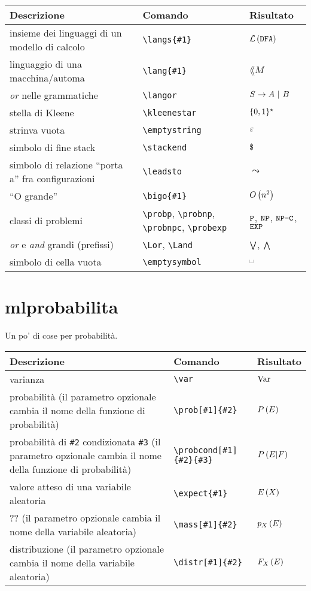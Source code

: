 \documentclass[draft]{article}
\begin{document}
\begin{center}
\begin{tabular}{ | p{7cm} | p{4cm} | p{4cm} | }
	\hline
	Descrizione & Comando & Risultato \\
	\hline
	insieme dei linguaggi di un modello di calcolo & \verb|\langs{#1}| & $\mathcal{L}\left( {\texttt{DFA}} \right)$ \\ \hline
	linguaggio di una macchina/automa & \verb|\lang{#1}| & $\lang{M}$ \\ \hline
	\emph{or} nelle grammatiche & \verb|\langor| & $S \to A \ | \  B$ \\ \hline
	stella di Kleene & \verb|\kleenestar| & $\{0,1\}^{\star}$ \\ \hline
	strinva vuota & \verb|\emptystring| & $\varepsilon$ \\ \hline
	simbolo di fine stack & \verb|\stackend| & $\stackend$ \\ \hline
	simbolo di relazione ``porta a'' fra configurazioni & \verb|\leadsto| & $\leadsto$ \\ \hline
	``O grande'' & \verb|\bigo{#1}| & $O\left( {n^2} \right)$ \\ \hline
	classi di problemi & \verb|\probp|, \verb|\probnp|, \verb|\probnpc|, \verb|\probexp| & $\texttt{P}$, $\texttt{NP}$, $\texttt{NP-C}$, $\texttt{EXP}$ \\ \hline
	\emph{or} e \emph{and} grandi (prefissi) & \verb|\Lor|, \verb|\Land| & $\bigvee$, $\bigwedge$ \\ \hline
	simbolo di cella vuota & \verb|\emptysymbol| & $\emptysymbol$ \\ \hline
\end{tabular}
\end{center}

\section{mlprobabilita}

Un po' di cose per probabilit\`a.

\begin{center}
\begin{tabular}{ | p{7cm} | p{4cm} | p{4cm} | }
	\hline
	Descrizione & Comando & Risultato \\
	\hline
	varianza & \verb|\var| & $\operatorname{Var}$ \\ \hline
	probabilit\`a (il parametro opzionale cambia il nome della funzione di probabilit\`a) & \verb|\prob[#1]{#2}| & $P \left( {E} \right)$ \\ \hline
	probabilit\`a di \verb|#2| condizionata \verb|#3| (il parametro opzionale cambia il nome della funzione di probabilit\`a) & \verb|\probcond[#1]{#2}{#3}| & $P \left( E | F \right)$ \\ \hline
	valore atteso di una variabile aleatoria & \verb|\expect{#1}| & $E \left( X \right)$ \\ \hline
	?? (il parametro opzionale cambia il nome della variabile aleatoria) & \verb|\mass[#1]{#2}| & $p_{X} \left( E \right)$ \\ \hline
	distribuzione (il parametro opzionale cambia il nome della variabile aleatoria) & \verb|\distr[#1]{#2}| & $F_{X} \left( E \right)$ \\ \hline
\end{tabular}
\end{center}
\end{document}

